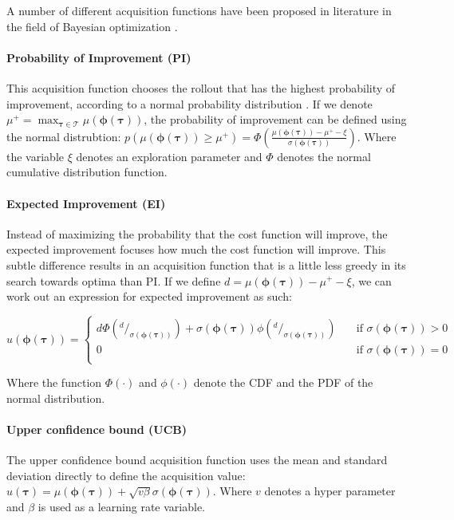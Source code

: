 \documentclass[mscThesis.tex]{subfiles}
\begin{document}
A number of different acquisition functions have been proposed in literature in the field of Bayesian optimization \cite{hoffman2011portfolio}. 

\paragraph{Probability of Improvement (PI)}
This acquisition function chooses the rollout that has the highest probability of improvement, according to a normal probability distribution \cite{kushner1964}. If we denote $\mu^+ = \max_{\bm{\tau} \in \mathcal{T}} \mu (\bm{\phi} (\bm{\tau}))$, the probability of improvement can be defined using the normal distrubtion: $p(\mu( \bm{\phi} (\bm{\tau})) \geq \mu^+) = \Phi \left( \frac{\mu( \bm{\phi} (\bm{\tau})) - \mu^+ -\xi}{\sigma( \bm{\phi} (\bm{\tau}))}\right)$. Where the variable $\xi$ denotes an exploration parameter and $\Phi$ denotes the normal cumulative distribution function.

\paragraph{Expected Improvement (EI)}
Instead of maximizing the probability that the cost function will improve, the expected improvement focuses how much the cost function will improve. This subtle difference results in an acquisition function that is a little less greedy in its search towards optima than PI. If we define $d = \mu( \bm{\phi} (\bm{\tau})) - \mu^+ -\xi$, we can work out an expression for expected improvement as such: 

\begin{equation}
u(\bm{\phi} (\bm{\tau})) =
  \begin{cases}
    d \Phi ( ^{d}/_{\sigma( \bm{\phi} (\bm{\tau}))} ) +\sigma( \bm{\phi} (\bm{\tau})) \phi(^{d}/_{\sigma( \bm{\phi} (\bm{\tau}))})  & \quad \text{if }  \sigma( \bm{\phi} (\bm{\tau})) > 0\\
    0  & \quad \text{if } \sigma( \bm{\phi} (\bm{\tau})) = 0\\
  \end{cases}
\end{equation}

Where the function $\Phi (\cdot)$ and $\phi (\cdot)$ denote the CDF and the PDF of the normal distribution. 


\paragraph{Upper confidence bound (UCB)}
The upper confidence bound acquisition function uses the mean and standard deviation directly to define the acquisition value: $u(\bm{\tau}) = \mu( \bm{\phi} (\bm{\tau})) + \sqrt{v \beta} \sigma( \bm{\phi} (\bm{\tau}))$.
Where $v$ denotes a hyper parameter and $\beta$ is used as a learning rate variable.
\end{document}
